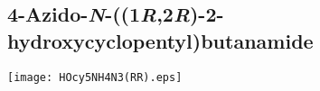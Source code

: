 %
%

\subsection{4\hyp{}Azido\hyp{}\textit{N}\hyp{}((1\textit{R},2\textit{R})\hyp{}2\hyp{}hydroxycyclopentyl)butanamide }


\begin{scheme}[H]
	\begin{center}
		\texttt{[image: HOcy5NH4N3(RR).eps]}
	\end{center}
\end{scheme}

